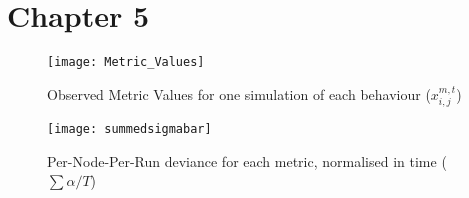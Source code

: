 \documentclass[aspectratio=169]{beamer}
\begin{document}
\section{Chapter 5}

\begin{frame}
	\begin{figure}
		\centering
		\texttt{[image: Metric\_Values]}
		\caption{Observed Metric Values for one simulation of each behaviour ($x_{i,j}^{m,t}$)}
		\label{fig:metric_values}
	\end{figure}
\end{frame}
\begin{frame}
	\begin{figure}
		\centering
		\texttt{[image: summedsigmabar]}
		\caption{Per-Node-Per-Run deviance for each metric, normalised in time ($\sum\alpha/T$)}
		\label{fig:summedsigmabar}
	\end{figure}
\end{frame}
\end{document}
